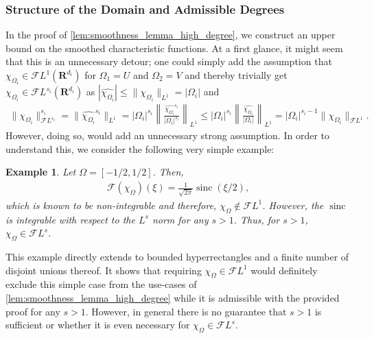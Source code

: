 \documentclass[a4paper]{article}
\newcommand{\rr}[1]{\mathbf{R}^{#1}}
\newcommand{\norm}[2]{\|#1\|_{#2}}
\newcommand{\normbig}[2]{\left\|#1\right\|_{#2}}
\newcommand{\F}[0]{\mathscr{F}}
\newcommand{\FL}[1]{\F L^{#1}}
\newcommand{\chF}[1]{\chi_{#1}}
\numberwithin{equation}{section}
\newtheorem{example}[theorem]{Example}
\theoremstyle{remark}
\begin{document}

\subsubsection{Structure of the Domain and Admissible Degrees}
\label{sec:structure_of_domain}
In the proof of \cref{lem:smoothness_lemma_high_degree}, we construct an upper bound on the smoothed characteristic functions.
At a first glance,
it might seem that this is an unnecessary detour;
one could simply add the assumption
that $\chF{\Omega_i}\in\FL{1}(\rr{d_i})$
for $\Omega_1=U$ and $\Omega_2=V$
and thereby trivially get $\chF{\Omega_i}\in\FL{s_i}(\rr{d_i})$
as $|\widehat{\chF{\Omega_i}}|\leq\norm{\chF{\Omega_i}}{L^1}=|\Omega_i|$
and
\begin{align*}
    \norm{\chF{\Omega_i}}{\FL{s_i}}^{s_i}
    =\norm{\widehat{\chF{\Omega_i}}^{s_i}}{L^1}
    =|\Omega_i|^{s_i}\normbig{\frac{\widehat{\chF{\Omega_i}}^{s_i}}{|\Omega_i|^{s_i}}}{L^1}
    \leq|\Omega_i|^{s_i}\normbig{\frac{\widehat{\chF{\Omega_i}}}{|\Omega_i|}}{L^1}
    =|\Omega_i|^{s_i-1}\norm{\chF{\Omega_i}}{\FL{1}}.
\end{align*}
However, doing so, would add an unnecessary strong assumption.
In order to understand this, we consider the following very simple example:
\begin{example}
    Let $\Omega=[-1/2,1/2]$.
    Then,
    \begin{align*}
        \mathscr{F}(\chF{\Omega})(\xi)
        =\frac{1}{\sqrt{2\pi}}\operatorname{sinc}(\xi/2),
    \end{align*}
    which is known to be non-integrable and therefore, $\chF{\Omega}\notin\FL{1}$.
    However, the $\operatorname{sinc}$ is integrable with respect to the $L^s$ norm for any $s>1$.
    Thus, for $s>1$, $\chF{\Omega}\in\FL{s}$.
\end{example}
This example directly extends to bounded hyperrectangles
and a finite number of disjoint unions thereof.
It shows that requiring $\chF{\Omega}\in\FL{1}$
would definitely exclude this simple case
from the use-cases of \cref{lem:smoothness_lemma_high_degree}
while it is admissible with the provided proof for any $s>1$.
However, in general there is no guarantee that $s>1$ is sufficient or whether it is even necessary for $\chF{\Omega}\in\FL{s}$.
\end{document}
